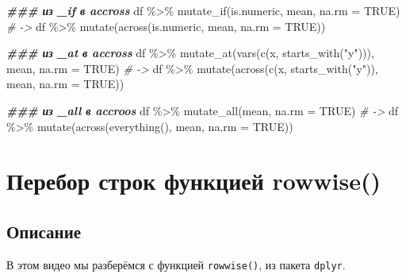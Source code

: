 \documentclass[
]{book}
\newenvironment{Shaded}{\begin{snugshade}}{\end{snugshade}}
\newcommand{\AttributeTok}[1]{\textcolor[rgb]{0.77,0.63,0.00}{#1}}
\newcommand{\CommentTok}[1]{\textcolor[rgb]{0.56,0.35,0.01}{\textit{#1}}}
\newcommand{\ConstantTok}[1]{\textcolor[rgb]{0.00,0.00,0.00}{#1}}
\newcommand{\DocumentationTok}[1]{\textcolor[rgb]{0.56,0.35,0.01}{\textbf{\textit{#1}}}}
\newcommand{\FunctionTok}[1]{\textcolor[rgb]{0.00,0.00,0.00}{#1}}
\newcommand{\NormalTok}[1]{#1}
\newcommand{\SpecialCharTok}[1]{\textcolor[rgb]{0.00,0.00,0.00}{#1}}
\newcommand{\StringTok}[1]{\textcolor[rgb]{0.31,0.60,0.02}{#1}}
\begin{document}
\begin{Shaded}
\begin{Highlighting}[]
\DocumentationTok{\#\#\# из \_if в accross}
\NormalTok{df }\SpecialCharTok{\%\textgreater{}\%} \FunctionTok{mutate\_if}\NormalTok{(is.numeric, mean, }\AttributeTok{na.rm =} \ConstantTok{TRUE}\NormalTok{)}
\CommentTok{\# {-}\textgreater{}}
\NormalTok{df }\SpecialCharTok{\%\textgreater{}\%} \FunctionTok{mutate}\NormalTok{(}\FunctionTok{across}\NormalTok{(is.numeric, mean, }\AttributeTok{na.rm =} \ConstantTok{TRUE}\NormalTok{))}

\DocumentationTok{\#\#\# из \_at в accross}
\NormalTok{df }\SpecialCharTok{\%\textgreater{}\%} \FunctionTok{mutate\_at}\NormalTok{(}\FunctionTok{vars}\NormalTok{(}\FunctionTok{c}\NormalTok{(x, }\FunctionTok{starts\_with}\NormalTok{(}\StringTok{"y"}\NormalTok{))), mean, }\AttributeTok{na.rm =} \ConstantTok{TRUE}\NormalTok{)}
\CommentTok{\# {-}\textgreater{}}
\NormalTok{df }\SpecialCharTok{\%\textgreater{}\%} \FunctionTok{mutate}\NormalTok{(}\FunctionTok{across}\NormalTok{(}\FunctionTok{c}\NormalTok{(x, }\FunctionTok{starts\_with}\NormalTok{(}\StringTok{"y"}\NormalTok{)), mean, }\AttributeTok{na.rm =} \ConstantTok{TRUE}\NormalTok{))}

\DocumentationTok{\#\#\# из \_all в accroos}
\NormalTok{df }\SpecialCharTok{\%\textgreater{}\%} \FunctionTok{mutate\_all}\NormalTok{(mean, }\AttributeTok{na.rm =} \ConstantTok{TRUE}\NormalTok{)}
\CommentTok{\# {-}\textgreater{}}
\NormalTok{df }\SpecialCharTok{\%\textgreater{}\%} \FunctionTok{mutate}\NormalTok{(}\FunctionTok{across}\NormalTok{(}\FunctionTok{everything}\NormalTok{(), mean, }\AttributeTok{na.rm =} \ConstantTok{TRUE}\NormalTok{))}
\end{Highlighting}
\end{Shaded}

\hypertarget{ux43fux435ux440ux435ux431ux43eux440-ux441ux442ux440ux43eux43a-ux444ux443ux43dux43aux446ux438ux435ux439-rowwise}{%
\chapter{Перебор строк функцией rowwise()}\label{ux43fux435ux440ux435ux431ux43eux440-ux441ux442ux440ux43eux43a-ux444ux443ux43dux43aux446ux438ux435ux439-rowwise}}

\hypertarget{ux43eux43fux438ux441ux430ux43dux438ux435-2}{%
\section{Описание}\label{ux43eux43fux438ux441ux430ux43dux438ux435-2}}

В этом видео мы разберёмся с функцией \texttt{rowwise()}, из пакета \texttt{dplyr}.
\end{document}
